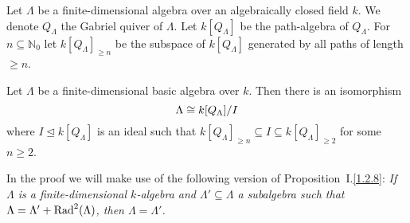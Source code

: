 %




Let $\Lambda$ be a finite-dimensional algebra over an algebraically closed field $k$.
We denote $Q_\Lambda$ the Gabriel quiver of $\Lambda$. Let $k[Q_\Lambda]$ be the path-algebra of
$Q_\Lambda$. For $n \subseteq \mathbb{N}_0$ let $k[Q_\Lambda]_{\geq n}$ be the subspace of $k[Q_\Lambda]$ generated by
all paths of length $\geq n$.


\begin{theorem}[Gabriel]\label{3.2.7}
  Let $\Lambda$ be a finite-dimensional basic algebra over $k$. Then there is an
  isomorphism
    \[ \Lambda \cong k[Q_\Lambda]/I \]
  where $I \trianglelefteq k[Q_\Lambda]$ is an ideal such that $k[Q_\Lambda]_{\geq n} \subseteq I \subseteq
  k[Q_\Lambda]_{\geq 2}$ for some $n \geq 2$.
\end{theorem}


\begin{remark}
In the proof we will make use of the following version of Proposition~I.\ref{1.2.8}: \textit{If $\Lambda$ is a finite-dimensional $k$-algebra and $\Lambda' \subseteq \Lambda$ a subalgebra such that $\Lambda = \Lambda' + \operatorname{Rad}^2(\Lambda)$, then $\Lambda = \Lambda'$.}
\end{remark}



